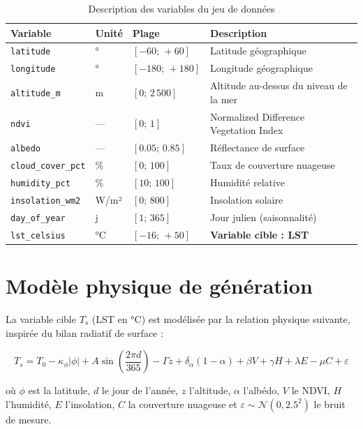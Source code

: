 \documentclass[a4paper,12pt]{report}
\begin{document}
\begin{table}[H]
\centering
\caption{Description des variables du jeu de donn\'ees}
\renewcommand{\arraystretch}{1.3}
\begin{tabular}{llll}
\toprule
\textbf{Variable} & \textbf{Unit\'e} & \textbf{Plage} & \textbf{Description} \\
\midrule
\texttt{latitude} & ° & $[-60;\,+60]$ & Latitude g\'eographique \\
\texttt{longitude} & ° & $[-180;\,+180]$ & Longitude g\'eographique \\
\texttt{altitude\_m} & m & $[0;\,2\,500]$ & Altitude au-dessus du niveau de la mer \\
\texttt{ndvi} & --- & $[0;\,1]$ & Normalized Difference Vegetation Index \\
\texttt{albedo} & --- & $[0.05;\,0.85]$ & R\'eflectance de surface \\
\texttt{cloud\_cover\_pct} & \% & $[0;\,100]$ & Taux de couverture nuageuse \\
\texttt{humidity\_pct} & \% & $[10;\,100]$ & Humidit\'e relative \\
\texttt{insolation\_wm2} & W/m² & $[0;\,800]$ & Insolation solaire \\
\texttt{day\_of\_year} & j & $[1;\,365]$ & Jour julien (saisonnalit\'e) \\
\midrule
\texttt{lst\_celsius} & °C & $[-16;\,+50]$ & \textbf{Variable cible : LST} \\
\bottomrule
\end{tabular}
\label{tab:variables}
\end{table}

\section{Mod\`ele physique de g\'en\'eration}

La variable cible $T_s$ (LST en °C) est mod\'elis\'ee par la relation physique suivante, inspir\'ee du bilan radiatif de surface :

\begin{equation}
T_s = T_0 - \kappa_\phi |\phi| + A\sin\!\left(\frac{2\pi d}{365}\right) - \Gamma z + \delta_\alpha (1-\alpha) + \beta V + \gamma H + \lambda E - \mu C + \varepsilon
\label{eq:physique}
\end{equation}

o\`u $\phi$ est la latitude, $d$ le jour de l'ann\'ee, $z$ l'altitude, $\alpha$ l'alb\'edo, $V$ le NDVI, $H$ l'humidit\'e, $E$ l'insolation, $C$ la couverture nuageuse et $\varepsilon \sim \mathcal{N}(0, 2.5^2)$ le bruit de mesure.
\end{document}

